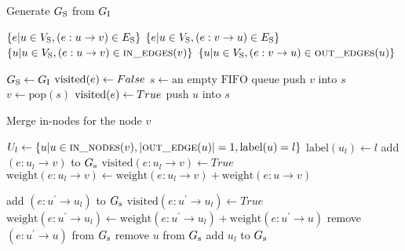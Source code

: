 \documentclass[11pt]{article}
\begin{document}
\begin{algorithm}[H]

\caption{Generate $G_{\rm S}$ from $G_{\rm I}$}          
\label{algGS}
\begin{algorithmic}[1]
	\State \Return $\{e|u \in V_{\rm S}, (e:u\rightarrow v) \in E_{\rm S} \} $
\EndFunction
{}
	\State \Return $\{e|u \in V_{\rm S}, (e:v\rightarrow u) \in E_{\rm S} \} $
\EndFunction
{}
	\State \Return $\{u|u \in V_{\rm S}, (e:u\rightarrow v) \in \Call{in\_edges}{v} \} $
\EndFunction
{}
	\State \Return $\{u|u \in V_{\rm S}, (e:v\rightarrow u) \in \Call{out\_edges}{u} \} $
\EndFunction

\State $ G_{\rm S}\gets G_{\rm I} $
	\State ${\rm visited}(e) \gets False$
\EndFor
\State $s \gets \textrm{an empty FIFO queue}$
		\State push $v$ into $s$
	\EndIf
\EndFor 
{}
	\State $v \gets \textrm{pop}(s)$
	\State {}
	\State {}
		\State $ {\rm visited}(e) \gets True $
	\EndFor
			\State push $u$ into $s$
		\EndIf
	\EndFor
\EndWhile
\end{algorithmic}
\end{algorithm}  


\begin{algorithm}[H]
\caption{Merge in-nodes for the node $v$}          
\label{algGSMergeIn}
\begin{algorithmic}[1]
	\State $U_l \gets \{u|u \in \Call{in\_nodes}{v}, |\Call{out\_edge}{u} | = 1, \textrm{label}(u) = l\}$ 
	\State $\textrm{label}(u_l) \gets l$
	\State add $(e:u_l \rightarrow v)$ to $G_{\rm s}$
	\State $\textrm{visited}(e:u_l \rightarrow v) \gets True$
		\State $\textrm{weight}(e:u_l \rightarrow v) \gets \textrm{weight}(e:u_l \rightarrow v) + \textrm{weight}(e:u \rightarrow v)$
		
			\State add $(e:u^\prime \rightarrow u_l)$ to $G_{\rm s}$
			\State $\textrm{visited}(e:u^\prime \rightarrow u_l) \gets True$
			\State $\textrm{weight}(e:u^\prime \rightarrow u_l) \gets \textrm{weight}(e:u^\prime \rightarrow u_l) +  \textrm{weight}(e:u^\prime \rightarrow u)$
			\State remove $(e:u^\prime \rightarrow u)$ from $G_{\rm s}$ 
		\EndFor
		\State remove $u$ from $G_{\rm s}$ 
	\EndFor 
	\State add $u_l$ to $G_{\rm s}$
	\State {} 
\EndFor
\EndFunction
\end{algorithmic}
\end{algorithm}  
\end{document}
